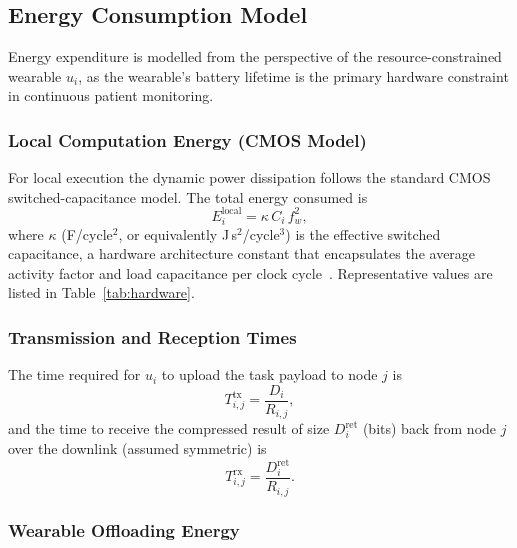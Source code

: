 \documentclass[journal,twoside,letterpaper]{IEEEtran}
\begin{document}
\subsection{Energy Consumption Model}
\label{subsec:energy}

Energy expenditure is modelled from the perspective of the resource-constrained
wearable $u_i$, as the wearable's battery lifetime is the primary hardware
constraint in continuous patient monitoring.

\subsubsection{Local Computation Energy (CMOS Model)}

For local execution the dynamic power dissipation follows the standard CMOS
switched-capacitance model.  The total energy consumed is
\begin{equation}
  E^{\mathrm{local}}_i = \kappa \, C_i \, f_w^2,
  \label{eq:energy_local}
\end{equation}
where $\kappa$ (F/cycle$^2$, or equivalently J\,s$^2$/cycle$^3$) is the
effective switched capacitance, a hardware architecture constant that
encapsulates the average activity factor and load capacitance per clock
cycle~\cite{burd1995processor}.  Representative values are listed in
Table~\ref{tab:hardware}.

\subsubsection{Transmission and Reception Times}

The time required for $u_i$ to upload the task payload to node $j$ is
\begin{equation}
  T^{\mathrm{tx}}_{i,j} = \frac{D_i}{R_{i,j}},
  \label{eq:time_tx}
\end{equation}
and the time to receive the compressed result of size $D^{\mathrm{ret}}_i$
(bits) back from node $j$ over the downlink (assumed symmetric) is
\begin{equation}
  T^{\mathrm{rx}}_{i,j} = \frac{D^{\mathrm{ret}}_i}{R_{i,j}}.
  \label{eq:time_rx}
\end{equation}

\subsubsection{Wearable Offloading Energy}
\end{document}
